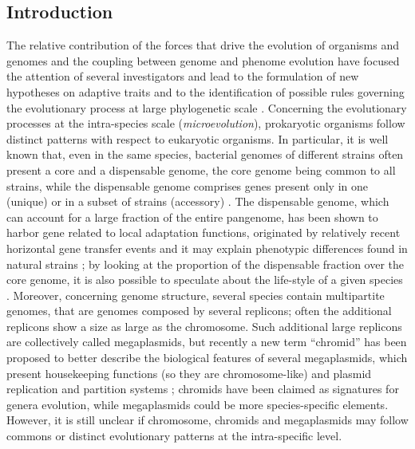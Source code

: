\subsection{Introduction}
The relative contribution of the forces that drive the evolution of organisms and genomes and the coupling between genome and phenome evolution have focused the attention of several investigators and lead to the formulation of new hypotheses on adaptive traits \cite{hughes2011evolution} and to the identification of possible rules governing the evolutionary process at large phylogenetic scale \cite{koonin2010constraints}. Concerning the evolutionary processes at the intra-species scale (\textit{microevolution}), prokaryotic organisms follow distinct patterns with respect to eukaryotic organisms. In particular, it is well known that, even in the same species, bacterial genomes of different strains often present a core and a dispensable genome, the core genome being common to all strains, while the dispensable genome comprises genes present only in one (unique) or in a subset of strains (accessory) \cite{tettelin2008comparative}. The dispensable genome, which can account for a large fraction of the entire pangenome, has been shown to harbor gene related to local adaptation functions, originated by relatively recent horizontal gene transfer events \cite{medini2008microbiology} and it may explain phenotypic differences found in natural strains \cite{biondi2009metabolic}; by looking at the proportion of the dispensable fraction over the core genome, it is also possible to speculate about the life-style of a given species \cite{tettelin2008comparative}. Moreover, concerning genome structure, several species contain multipartite genomes, that are genomes composed by several replicons; often the additional replicons show a size as large as the chromosome. Such additional large replicons are collectively called megaplasmids, but recently a new term “chromid” has been proposed to better describe the biological features of several megaplasmids, which present housekeeping functions (so they are chromosome-like) and plasmid replication and partition systems \cite{harrison2010introducing}; chromids have been claimed as signatures for genera evolution, while megaplasmids could be more species-specific elements. However, it is still unclear if chromosome, chromids and megaplasmids may follow commons or distinct evolutionary patterns at the intra-specific level. 
